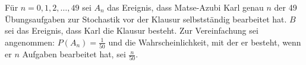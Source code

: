 \documentclass{abgabe}
\begin{document}
\begin{questions}
    \question
    Für $n = 0, 1, 2, \ldots, 49 $ sei $A_n$ das Ereignis, dass Matse-Azubi Karl genau $n$ der 49 Übungsaufgaben zur Stochastik vor der Klausur selbstständig bearbeitet hat.
    $B$ sei das Ereignis, dass Karl die Klausur besteht. 
    Zur Vereinfachung sei angenommen:
    $P(A_n) = \frac{1}{50}$ und die Wahrscheinlichkeit, mit der er besteht, wenn er $n$ Aufgaben bearbeitet hat, sei $\frac{n}{50}$.
\end{questions}
\end{document}
